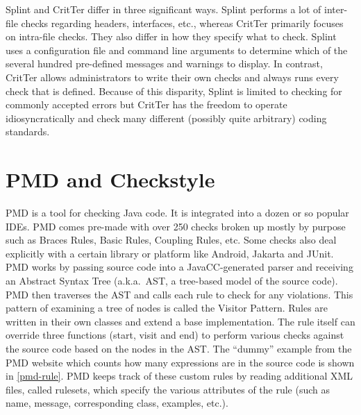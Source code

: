 \documentclass[12pt]{report}
\newcommand{\programName}{CritTer\xspace}
\begin{document}
Splint and \programName differ in three significant ways. Splint performs a lot of inter-file checks 
regarding headers, interfaces, etc., whereas \programName primarily focuses on intra-file checks. 
They also differ in how they specify what to check. Splint uses a configuration file and command line 
arguments to determine which of the several hundred pre-defined messages and warnings to display. In 
contrast, \programName allows administrators to write their own checks and always runs every check 
that is defined.  Because of this disparity, Splint is limited to checking for commonly accepted errors but 
\programName has the freedom to operate idiosyncratically and check many different (possibly quite 
arbitrary) coding standards. 

\section{PMD and Checkstyle}
\label{sec:pmdAndCheckstyle}

PMD is a tool for checking Java code. It is integrated into a dozen or so popular IDEs.
PMD comes pre-made with over 250 checks broken up mostly by purpose such as Braces Rules, 
Basic Rules, Coupling Rules, etc. Some checks also deal explicitly with a certain 
library or platform like Android, Jakarta and JUnit. PMD works by passing source code into a 
JavaCC-generated parser and receiving an Abstract Syntax Tree (a.k.a.\ AST, a tree-based model of 
the source code). PMD then traverses the AST and calls each rule to check for any
violations. This pattern of examining a tree of nodes is called the Visitor Pattern\cite{design-patterns}. 
Rules are written in their own classes and extend a base implementation. The rule itself can 
override three functions (start, visit and end) to perform various checks against the source code based 
on the nodes in the AST. The ``dummy'' example from the PMD website which counts how 
many expressions are in the source code is shown in \autoref{pmd-rule}. PMD keeps track of these 
custom rules by reading additional XML files, called rulesets, which specify the various attributes of the 
rule (such as name, message, corresponding class, examples, etc.).
\end{document}
